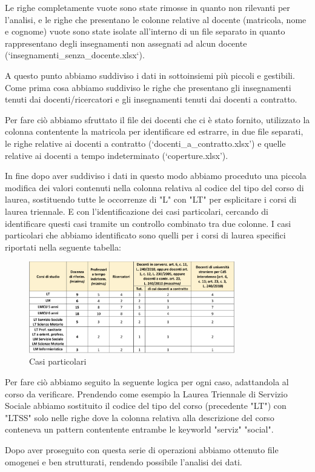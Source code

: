 Le righe completamente vuote sono state rimosse in quanto non rilevanti per l'analisi, e le righe che presentano le colonne relative al docente (matricola, nome e cognome) vuote sono state
isolate all'interno di un file separato in quanto rappresentano degli insegnamenti non assegnati ad alcun docente (`insegnamenti_senza_docente.xlsx`).

A questo punto abbiamo suddiviso i dati in sottoinsiemi più piccoli e gestibili.
Come prima cosa abbiamo suddiviso le righe che presentano gli insegnamenti tenuti dai docenti/ricercatori e gli insegnamenti tenuti dai docenti a contratto.

Per fare ciò abbiamo sfruttato il file dei docenti che ci è stato fornito, utilizzato la colonna contentente la matricola per identificare ed estrarre, in due file separati,
le righe relative ai docenti a contratto (`docenti_a_contratto.xlsx') e quelle relative ai docenti a tempo indeterminato (`coperture.xlsx').

In fine dopo aver suddiviso i dati in questo modo abbiamo proceduto una piccola modifica dei valori contenuti nella colonna relativa al
codice del tipo del corso di laurea, sostituendo tutte le occorrenze di "L" con "LT" per esplicitare i corsi di laurea triennale.
E con l'identificazione dei casi particolari, cercando di identificare questi casi tramite un controllo combinato tra due colonne.
I casi particolari che abbiamo identificato sono quelli per i corsi di laurea specifici riportati nella seguente tabella:
\begin{figure}[h]
    \centering
    \includegraphics[width=0.8\textwidth]{images/tabella_ministeriale.png}
    \caption{Casi particolari}
    \label{fig:casi_particolari}
\end{figure}

Per fare ciò abbiamo seguito la seguente logica per ogni caso, adattandola al corso da verificare.
Prendendo come esempio la Laurea Triennale di Servizio Sociale abbiamo sostituito il codice del tipo del corso (precedente "LT") con "LTSS"
solo nelle righe dove la colonna relativa alla descrizione del corso conteneva un pattern contentente entrambe le keyworld "serviz" "social".

Dopo aver proseguito con questa serie di operazioni abbiamo ottenuto file omogenei e ben strutturati, rendendo possibile l'analisi dei dati.
